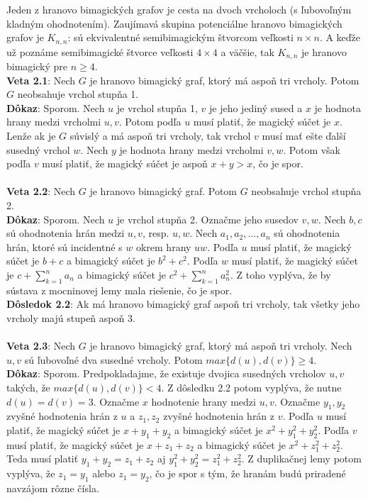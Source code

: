 \documentclass[12pt]{article}
\begin{document}
Jeden z hranovo bimagických grafov je cesta na dvoch vrcholoch (s ľubovoľným kladným ohodnotením). Zaujímavá skupina potenciálne hranovo bimagických grafov je $K _{n,n}$: sú ekvivalentné semibimagickým štvorcom veľkosti $n \times n$. A keďže už poznáme semibimagické štvorce veľkosti $4 \times 4$ a väčšie, tak $K _{n,n}$ je hranovo bimagický pre $n \geq 4$.  \\

\textbf{Veta 2.1}: Nech $G$ je hranovo bimagický graf, ktorý má aspoň tri vrcholy. Potom $G$ neobsahuje vrchol stupňa 1. \\

\textbf{Dôkaz}: Sporom. Nech $u$ je vrchol stupňa 1, $v$ je jeho jediný sused a $x$ je hodnota hrany medzi vrcholmi $u,v$. Potom podľa $u$ musí platiť, že magický súčet je $x$. Lenže ak je $G$ súvislý a má aspoň tri vrcholy, tak vrchol $v$ musí mať ešte ďalší susedný vrchol $w$. Nech $y$ je hodnota hrany medzi vrcholmi $v,w$. Potom však podľa $v$ musí platiť, že magický súčet je aspoň $x + y > x$, čo je spor. \\\\ 

\textbf{Veta 2.2}: Nech $G$ je hranovo bimagický graf. Potom $G$ neobsahuje vrchol stupňa 2. \\

\textbf{Dôkaz}: Sporom. Nech $u$ je vrchol stupňa 2. Označme jeho susedov $v,w$. Nech $b,c$ sú ohodnotenia hrán medzi $u,v$, resp. $u,w$. Nech $a_1, a_2, ... , a_n$ sú ohodnotenia hrán, ktoré sú incidentné s $w$ okrem hrany $uw$. Podľa $u$ musí platiť, že magický súčet je $b+c$ a bimagický súčet je $b^2 + c^2$. Podľa $w$ musí platiť, že magický súčet je $c + \sum_{k=1}^{n} a_n$ a bimagický súčet je $c^2 + \sum_{k=1}^{n} a^2_n$. Z toho vyplýva, že by sústava z mocninovej lemy mala riešenie, čo je spor. \\

\textbf{Dôsledok 2.2}: Ak má hranovo bimagický graf aspoň tri vrcholy, tak všetky jeho vrcholy majú stupeň aspoň 3. \\\\

\textbf{Veta 2.3}: Nech $G$ je hranovo bimagický graf, ktorý má aspoň tri vrcholy. Nech $u,v$ sú ľubovoľné dva susedné vrcholy. Potom $max \{d(u), d(v)\} \geq 4$. \\

\textbf{Dôkaz}: Sporom. Predpokladajme, že existuje dvojica susedných vrcholov $u,v$ takých, že $max \{d(u), d(v)\} < 4$. Z dôsledku 2.2 potom vyplýva, že nutne $d(u) = d(v) = 3$. Označme $x$ hodnotenie hrany medzi $u,v$. Označme $y_1, y_2$ zvyšné hodnotenia hrán z $u$ a $z_1, z_2$ zvyšné hodnotenia hrán z $v$. Podľa $u$ musí platiť, že magický súčet je $x + y_1 + y_2$ a bimagický súčet je $x^2 + y^2_1 + y^2_2$. Podľa $v$ musí platiť, že magický súčet je $x + z_1 + z_2$ a bimagický súčet je $x^2 + z^2_1 + z^2_2$. Teda musí platiť $y_1 + y_2 = z_1 + z_2$ aj $y^2_1 + y^2_2 = z^2_1 + z^2_2$. Z duplikačnej lemy potom vyplýva, že $z_1 = y_1$ alebo $z_1 = y_2$, čo je spor s tým, že hranám budú priradené navzájom rôzne čísla.  \\
\end{document}
